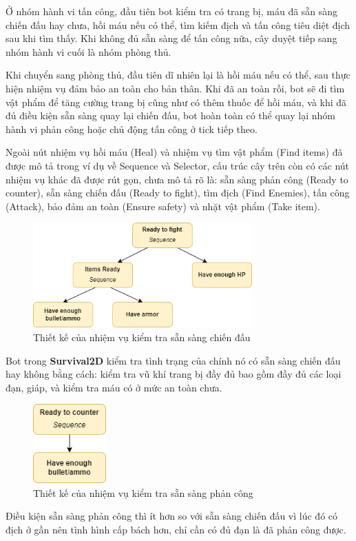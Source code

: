 \documentclass[12pt,a4paper]{article}
\begin{document}
  Ở nhóm hành vi tấn công, đầu tiên bot kiểm tra có trang bị, máu đã sẵn sàng chiến đấu hay chưa, hồi máu nếu có thể, tìm kiếm địch và tấn công tiêu diệt địch sau khi tìm thấy. Khi không đủ sẵn sàng để tấn công nữa, cây duyệt tiếp sang nhóm hành vi cuối là nhóm phòng thủ.

  Khi chuyển sang phòng thủ, đầu tiên dĩ nhiên lại là hồi máu nếu có thể, sau thực hiện nhiệm vụ đảm bảo an toàn cho bản thân. Khi đã an toàn rồi, bot sẽ đi tìm vật phẩm để tăng cường trang bị cũng như có thêm thuốc để hồi máu, và khi đã đủ điều kiện sẵn sàng quay lại chiến đấu, bot hoàn toàn có thể quay lại nhóm hành vi phản công hoặc chủ động tấn công ở tick tiếp theo.

  Ngoài nút nhiệm vụ hồi máu (Heal) và nhiệm vụ tìm vật phẩm (Find items) đã được mô tả trong ví dụ về Sequence và Selector, cấu trúc cây trên còn có các nút nhiệm vụ khác đã được rút gọn, chưa mô tả rõ là: sẵn sàng phản công (Ready to counter), sẵn sàng chiến đấu (Ready to fight), tìm địch (Find Enemies), tấn công (Attack), bảo đảm an toàn (Ensure safety) và nhặt vật phẩm (Take item).

  \begin{figure}[H]
      \centering
      \includegraphics[width=0.75\textwidth]{Img/AI/ready-to-fight.png}
      \caption{Thiết kế của nhiệm vụ kiểm tra sẵn sàng chiến đấu}
  \end{figure}
  Bot trong \textbf{Survival2D} kiểm tra tình trạng của chính nó có sẵn sàng chiến đấu hay không bằng cách: kiểm tra vũ khí trang bị đầy đủ bao gồm đầy đủ các loại đạn, giáp, và kiểm tra máu có ở mức an toàn chưa.

  \begin{figure}[H]
      \centering
      \includegraphics[width=0.25\textwidth]{Img/AI/ready-to-counter.png}
      \caption{Thiết kế của nhiệm vụ kiểm tra sẵn sàng phản công}
  \end{figure}
  Điều kiện sẵn sàng phản công thì ít hơn so với sẵn sàng chiến đấu vì lúc đó có địch ở gần nên tình hình cấp bách hơn, chỉ cần có đủ đạn là đã phản công được.
\end{document}
